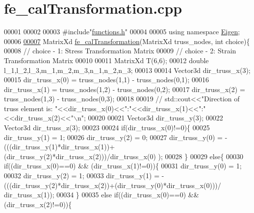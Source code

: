 \hypertarget{fe__cal_transformation_8cpp_source}{}\section{fe\+\_\+cal\+Transformation.\+cpp}
\label{fe__cal_transformation_8cpp_source}

\begin{DoxyCode}
00001 
00002 
00003 \textcolor{preprocessor}{#include"\hyperlink{functions_8h}{functions.h}"}
00004 
00005 \textcolor{keyword}{using namespace }\hyperlink{namespace_eigen}{Eigen};
00006 
\hyperlink{fe__cal_transformation_8cpp_aa41c40dffea4251a07a8a3f5062f47ae}{00007} MatrixXd \hyperlink{fe__cal_transformation_8cpp_aa41c40dffea4251a07a8a3f5062f47ae}{fe\_calTransformation}(MatrixXd truss\_nodes, \textcolor{keywordtype}{int} choice)\{
00008 \textcolor{comment}{// choice - 1: Stress Transformation Matrix}
00009 \textcolor{comment}{// choice - 2: Strain Transformation Matrix}
00010 
00011     MatrixXd T(6,6);
00012     \textcolor{keywordtype}{double} l\_1,l\_2,l\_3,m\_1,m\_2,m\_3,n\_1,n\_2,n\_3;
00013 
00014     Vector3d dir\_truss\_x(3);
00015     dir\_truss\_x(0) = truss\_nodes(1,1) - truss\_nodes(0,1);
00016     dir\_truss\_x(1) = truss\_nodes(1,2) - truss\_nodes(0,2);
00017     dir\_truss\_x(2) = truss\_nodes(1,3) - truss\_nodes(0,3);
00018 
00019     \textcolor{comment}{// std::cout<<"Direction of truss element is:
       "<<dir\_truss\_x(0)<<":"<<dir\_truss\_x(1)<<":"<<dir\_truss\_x(2)<<"\(\backslash\)n";}
00020 
00021     Vector3d dir\_truss\_y(3);
00022     Vector3d dir\_truss\_z(3);
00023     
00024     \textcolor{keywordflow}{if}(dir\_truss\_x(0)!=0)\{
00025         dir\_truss\_y(1) = 1; 
00026         dir\_truss\_y(2) = 0;
00027         dir\_truss\_y(0) = -(((dir\_truss\_y(1)*dir\_truss\_x(1))+(dir\_truss\_y(2)*dir\_truss\_x(2)))/dir\_truss\_x(0)
      );
00028     \}
00029     \textcolor{keywordflow}{else}\{
00030         \textcolor{keywordflow}{if}((dir\_truss\_x(0)==0) && (dir\_truss\_x(1)!=0))\{
00031             dir\_truss\_y(0) = 1;
00032             dir\_truss\_y(2) = 1;
00033             dir\_truss\_y(1) = -(((dir\_truss\_y(2)*dir\_truss\_x(2))+(dir\_truss\_y(0)*dir\_truss\_x(0)))/
      dir\_truss\_x(1));       
00034         \}
00035         \textcolor{keywordflow}{else} \textcolor{keywordflow}{if}((dir\_truss\_x(0)==0) && (dir\_truss\_x(2)!=0))\{

\end{DoxyCode}
